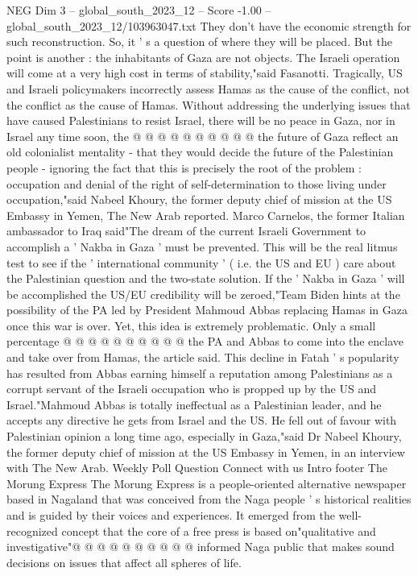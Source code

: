 \begin{textsample}{NEG Dim 3 – global\_south\_2023\_12 – Score -1.00 – global\_south\_2023\_12/103963047.txt}
They don't have the economic strength for such reconstruction.
So, it ' s a question of where they will be placed.
But the point is another : the inhabitants of Gaza are not objects.
The Israeli operation will come at a very high cost in terms of stability,"said Fasanotti.
Tragically, US and Israeli policymakers incorrectly assess Hamas as the cause of the conflict, not the conflict as the cause of Hamas.
Without addressing the underlying issues that have caused Palestinians to resist Israel, there will be no peace in Gaza, nor in Israel any time soon, the @ @ @ @ @ @ @ @ @ @ the future of Gaza reflect an old colonialist mentality - that they would decide the future of the Palestinian people - ignoring the fact that this is precisely the root of the problem : occupation and denial of the right of self-determination to those living under occupation,"said Nabeel Khoury, the former deputy chief of mission at the US Embassy in Yemen, The New Arab reported.
Marco Carnelos, the former Italian ambassador to Iraq said"The dream of the current Israeli Government to accomplish a ' Nakba in Gaza ' must be prevented.
This will be the real litmus test to see if the ' international community ' ( i.e. the US and EU ) care about the Palestinian question and the two-state solution.
If the ' Nakba in Gaza ' will be accomplished the US/EU credibility will be zeroed,"Team Biden hints at the possibility of the PA led by President Mahmoud Abbas replacing Hamas in Gaza once this war is over.
Yet, this idea is extremely problematic.
Only a small percentage @ @ @ @ @ @ @ @ @ @ the PA and Abbas to come into the enclave and take over from Hamas, the article said.
This decline in Fatah ' s popularity has resulted from Abbas earning himself a reputation among Palestinians as a corrupt servant of the Israeli occupation who is propped up by the US and Israel."Mahmoud Abbas is totally ineffectual as a Palestinian leader, and he accepts any directive he gets from Israel and the US.
He fell out of favour with Palestinian opinion a long time ago, especially in Gaza,"said Dr Nabeel Khoury, the former deputy chief of mission at the US Embassy in Yemen, in an interview with The New Arab.
Weekly Poll Question Connect with us Intro footer The Morung Express The Morung Express is a people-oriented alternative newspaper based in Nagaland that was conceived from the Naga people ' s historical realities and is guided by their voices and experiences.
It emerged from the well-recognized concept that the core of a free press is based on"qualitative and investigative"@ @ @ @ @ @ @ @ @ @ informed Naga public that makes sound decisions on issues that affect all spheres of life.

\end{textsample}

